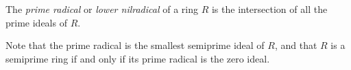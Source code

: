 \documentclass[12pt]{article}
\begin{document}
The {\it prime radical} or {\it lower nilradical} of a ring $R$ is the intersection of all the prime ideals of $R$.

Note that the prime radical is the smallest semiprime ideal of $R$, and that $R$ is a semiprime ring if and only if its prime radical is the zero ideal.
\end{document}
